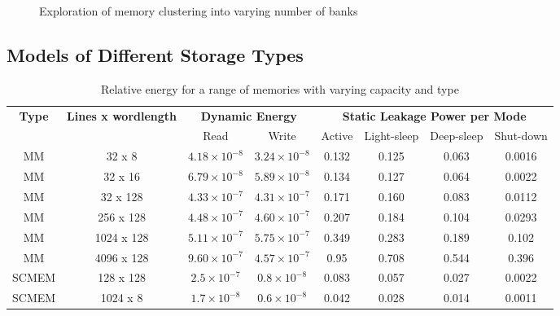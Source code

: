 \documentclass{acm_proc_article-sp}
\begin{document}
\begin{figure}[!t]
\centering
\caption{Exploration of memory clustering into varying number of banks}
\label{fig:platform}
\end{figure}

\subsection{Models of Different Storage Types}

\begin{center}
	\begin{table*}[!t]
	\caption{Relative energy for a range of memories with varying capacity and type}
	\label{tab:relative}
	{\small
	\hfill{}
	\begin{tabular}{|c|c|c|c|c|c|c|c|}
		\hline
		\multirow{2}{*}{\textbf{Type}} & \multirow{2}{*}{\textbf{Lines x wordlength}} & \multicolumn{2}{c|}{\textbf{Dynamic Energy}}& \multicolumn{4}{c|}{\textbf{Static Leakage Power per Mode}}\\ \cline{3-8}
		& & Read & Write & Active & Light-sleep & Deep-sleep & Shut-down \\ 
		\hline 
		MM & 32 x 8 &  $ 4.18 \times 10^{-8} $ &  $ 3.24 \times 10^{-8} $ & 0.132 & 0.125 & 0.063 & 0.0016\\ 
		\hline
		MM & 32 x 16 & $  6.79 \times 10^{-8} $ &  $ 5.89 \times 10^{-8} $ & 0.134 & 0.127 & 0.064 & 0.0022\\ 
		\hline
		MM & 32 x 128 & $  4.33 \times 10^{-7} $ &  $ 4.31 \times 10^{-7} $ & 0.171 & 0.160 & 0.083 & 0.0112\\ 
		\hline
		MM & 256 x 128 & $  4.48 \times 10^{-7} $ &  $ 4.60 \times 10^{-7} $ & 0.207 & 0.184 & 0.104 & 0.0293\\ 
		\hline
		MM & 1024 x 128 & $  5.11 \times 10^{-7} $ &  $ 5.75 \times 10^{-7} $ & 0.349 & 0.283 & 0.189 & 0.102\\ 
		\hline
		MM & 4096 x 128 & $  9.60 \times 10^{-7} $ &  $ 4.57 \times 10^{-7} $ & 0.95 & 0.708 & 0.544 & 0.396\\ 
		\hline
		SCMEM & 128 x 128 & $  2.5 \times 10^{-7} $ &  $ 0.8 \times 10^{-8} $ & 0.083 & 0.057 & 0.027 & 0.0022\\ 
		\hline
		SCMEM & 1024 x 8 & $  1.7 \times 10^{-8} $ &  $ 0.6 \times 10^{-8} $ & 0.042 & 0.028 & 0.014 & 0.0011\\ 
		\hline
	\end{tabular}}
	\hfill{}
	\\
	\end{table*}
\end{center}
\end{document}
